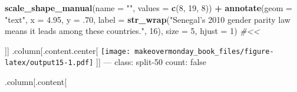 \documentclass[]{book}
\newenvironment{Shaded}{\begin{snugshade}}{\end{snugshade}}
\newcommand{\KeywordTok}[1]{\textcolor[rgb]{0.13,0.29,0.53}{\textbf{#1}}}
\newcommand{\DataTypeTok}[1]{\textcolor[rgb]{0.13,0.29,0.53}{#1}}
\newcommand{\DecValTok}[1]{\textcolor[rgb]{0.00,0.00,0.81}{#1}}
\newcommand{\FloatTok}[1]{\textcolor[rgb]{0.00,0.00,0.81}{#1}}
\newcommand{\StringTok}[1]{\textcolor[rgb]{0.31,0.60,0.02}{#1}}
\newcommand{\CommentTok}[1]{\textcolor[rgb]{0.56,0.35,0.01}{\textit{#1}}}
\newcommand{\OperatorTok}[1]{\textcolor[rgb]{0.81,0.36,0.00}{\textbf{#1}}}
\newcommand{\NormalTok}[1]{#1}
\theoremstyle{definition}
\theoremstyle{definition}
\theoremstyle{definition}
\theoremstyle{remark}
\begin{document}
\begin{Shaded}
\begin{Highlighting}[]
\StringTok{  }\KeywordTok{scale_shape_manual}\NormalTok{(}\DataTypeTok{name =} \StringTok{""}\NormalTok{, }\DataTypeTok{values =} \KeywordTok{c}\NormalTok{(}\DecValTok{8}\NormalTok{, }\DecValTok{19}\NormalTok{, }\DecValTok{8}\NormalTok{)) }\OperatorTok{+}
\StringTok{  }\KeywordTok{annotate}\NormalTok{(}\DataTypeTok{geom =} \StringTok{"text"}\NormalTok{, }\DataTypeTok{x =} \FloatTok{4.95}\NormalTok{, }\DataTypeTok{y =}\NormalTok{ .}\DecValTok{70}\NormalTok{, }\DataTypeTok{label =} \KeywordTok{str_wrap}\NormalTok{(}\StringTok{"Senegal's 2010 gender parity law means it leads among these countries."}\NormalTok{, }\DecValTok{16}\NormalTok{), }\DataTypeTok{size =} \DecValTok{5}\NormalTok{, }\DataTypeTok{hjust =} \DecValTok{1}\NormalTok{)  }\CommentTok{#<<}
\end{Highlighting}
\end{Shaded}

{]}{]} .column{[}.content.center{[}
\texttt{[image: makeovermonday\_book\_files/figure-latex/output15-1.pdf]}
{]}{]} --- class: split-50 count: false

.column{[}.content{[}
\end{document}
